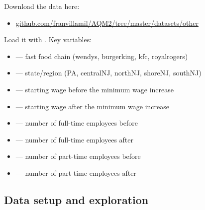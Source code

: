 Download the data here:
\begin{itemize}
  \item \href{https://github.com/franvillamil/AQM2/tree/master/datasets/other}{github.com/franvillamil/AQM2/tree/master/datasets/other}
\end{itemize}

Load it with . Key variables:
\begin{itemize}
  \item {} --- fast food chain (wendys, burgerking, kfc, royalrogers)
  \item {} --- state/region (PA, centralNJ, northNJ, shoreNJ, southNJ)
  \item {} --- starting wage before the minimum wage increase
  \item {} --- starting wage after the minimum wage increase
  \item {} --- number of full-time employees before
  \item {} --- number of full-time employees after
  \item {} --- number of part-time employees before
  \item {} --- number of part-time employees after
\end{itemize}

\subsection{Data setup and exploration}

